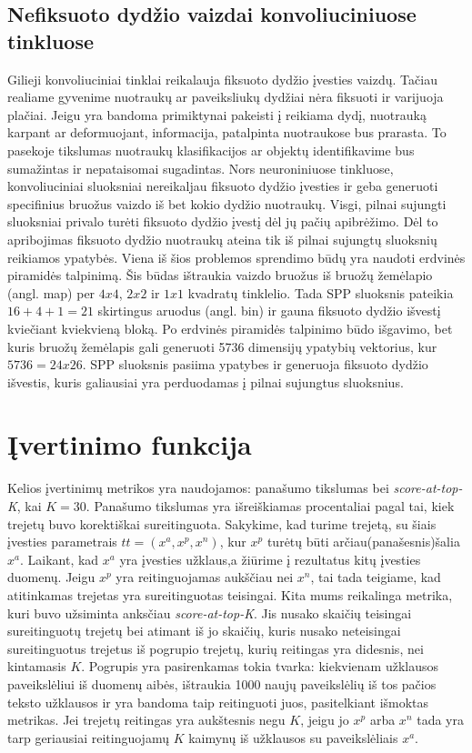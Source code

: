 \documentclass{VUMIFPSkursinis}
\begin{document}
\subsection{Nefiksuoto dydžio vaizdai konvoliuciniuose tinkluose}
Gilieji konvoliuciniai tinklai reikalauja fiksuoto dydžio įvesties vaizdų. Tačiau realiame gyvenime nuotraukų ar paveiksliukų dydžiai nėra fiksuoti ir varijuoja plačiai.
\newline
Jeigu yra bandoma primiktynai pakeisti į reikiama dydį, nuotrauką karpant ar deformuojant, informacija, patalpinta nuotraukose bus prarasta. To pasekoje tikslumas nuotraukų klasifikacijos ar objektų identifikavime bus sumažintas ir nepataisomai sugadintas. Nors neuroniniuose tinkluose, konvoliuciniai sluoksniai nereikaljau fiksuoto dydžio įvesties ir geba generuoti specifinius bruožus vaizdo iš bet kokio dydžio nuotraukų. Visgi, pilnai sujungti sluoksniai privalo turėti fiksuoto dydžio įvestį dėl jų pačių apibrėžimo. Dėl to apribojimas fiksuoto dydžio nuotraukų ateina tik iš pilnai sujungtų sluoksnių reikiamos ypatybės.
Viena iš šios problemos sprendimo būdų yra naudoti erdvinės piramidės talpinimą\cite{Spatial_pyramid_pooling}.
\newline
Šis būdas ištraukia vaizdo bruožus iš bruožų žemėlapio (angl. map) per $4 x 4$, $2 x 2$ ir $1 x 1$ kvadratų tinklelio. Tada SPP sluoksnis pateikia $16 + 4 + 1 = 21$ skirtingus aruodus (angl. bin) ir gauna fiksuoto dydžio išvestį kviečiant kviekvieną bloką. Po erdvinės piramidės talpinimo būdo išgavimo, bet kuris bruožų žemėlapis gali generuoti 5736 dimensijų ypatybių vektorius, kur $5736 = 24 x 26$. SPP sluoksnis pasiima ypatybes ir generuoja  fiksuoto dydžio išvestis, kuris galiausiai yra perduodamas į pilnai sujungtus sluoksnius.
\pagebreak

\section{Įvertinimo funkcija}
Kelios įvertinimų metrikos yra naudojamos: panašumo tikslumas bei \emph{score-at-top-K}, kai $K = 30$. Panašumo tikslumas yra išreiškiamas procentaliai pagal tai, kiek trejetų buvo korektiškai sureitinguota. Sakykime, kad turime trejetą, su šiais įvesties parametrais $tt = (x^a, x^p, x^n)$, kur $x^p$ turėtų būti arčiau(panašesnis)šalia $x^a$. Laikant, kad $x^a$ yra įvesties užklaus,a žiūrime į rezultatus kitų įvesties duomenų. Jeigu $x^p$ yra reitinguojamas aukščiau nei $x^n$, tai tada teigiame, kad atitinkamas trejetas yra sureitinguotas teisingai. Kita mums reikalinga metrika, kuri buvo užsiminta anksčiau \emph{score-at-top-K}. Jis nusako skaičių teisingai sureitinguotų trejetų bei atimant iš jo skaičių, kuris nusako neteisingai sureitinguotus trejetus iš pogrupio trejetų, kurių reitingas yra didesnis, nei kintamasis $K$. Pogrupis yra pasirenkamas tokia tvarka: kiekvienam užklausos paveikslėliui iš duomenų aibės, ištraukia 1000 naujų paveikslėlių iš tos pačios teksto užklausos ir yra bandoma taip reitinguoti juos, pasitelkiant išmoktas metrikas. Jei trejetų reitingas yra aukštesnis negu $K$, jeigu jo $x^p$ arba $x^n$ tada yra tarp geriausiai reitinguojamų $K$ kaimynų iš užklausos su paveikslėliais $x^a$.
\pagebreak
\end{document}
